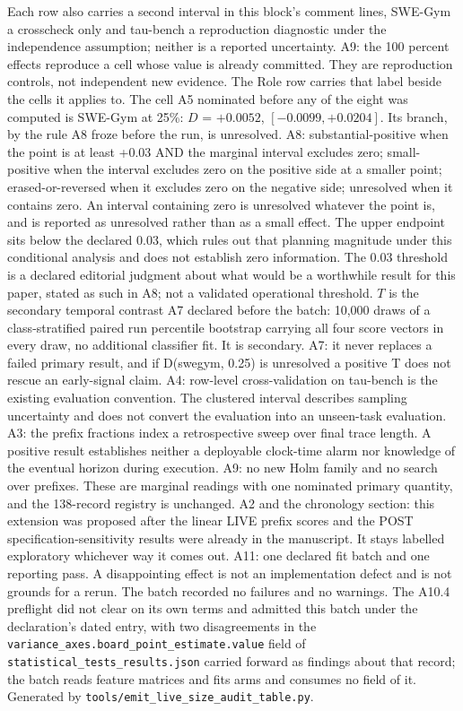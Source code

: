 Each row also carries a second interval in this block's comment lines, SWE-Gym a crosscheck only and tau-bench a reproduction diagnostic under the independence assumption; neither is a reported uncertainty.
A9: the 100 percent effects reproduce a cell whose value is already committed. They are reproduction controls, not independent new evidence.
The Role row carries that label beside the cells it applies to.
The cell A5 nominated before any of the eight was computed is SWE-Gym at 25\%: $D$ = $+0.0052$, $[-0.0099, +0.0204]$.
Its branch, by the rule A8 froze before the run, is unresolved.
A8: substantial-positive when the point is at least +0.03 AND the marginal interval excludes zero; small-positive when the interval excludes zero on the positive side at a smaller point; erased-or-reversed when it excludes zero on the negative side; unresolved when it contains zero.
An interval containing zero is unresolved whatever the point is, and is reported as unresolved rather than as a small effect.
The upper endpoint sits below the declared 0.03, which rules out that planning magnitude under this conditional analysis and does not establish zero information.
The 0.03 threshold is a declared editorial judgment about what would be a worthwhile result for this paper, stated as such in A8; not a validated operational threshold.
$T$ is the secondary temporal contrast A7 declared before the batch: 10,000 draws of a class-stratified paired run percentile bootstrap carrying all four score vectors in every draw, no additional classifier fit.
It is secondary. A7: it never replaces a failed primary result, and if D(swegym, 0.25) is unresolved a positive T does not rescue an early-signal claim.
A4: row-level cross-validation on tau-bench is the existing evaluation convention. The clustered interval describes sampling uncertainty and does not convert the evaluation into an unseen-task evaluation.
A3: the prefix fractions index a retrospective sweep over final trace length. A positive result establishes neither a deployable clock-time alarm nor knowledge of the eventual horizon during execution.
A9: no new Holm family and no search over prefixes. These are marginal readings with one nominated primary quantity, and the 138-record registry is unchanged.
A2 and the chronology section: this extension was proposed after the linear LIVE prefix scores and the POST specification-sensitivity results were already in the manuscript. It stays labelled exploratory whichever way it comes out.
A11: one declared fit batch and one reporting pass. A disappointing effect is not an implementation defect and is not grounds for a rerun.
The batch recorded no failures and no warnings.
The A10.4 preflight did not clear on its own terms and admitted this batch under the declaration's dated entry, with two disagreements in the \texttt{variance\_axes.board\_point\_estimate.value} field of \texttt{statistical\_tests\_results.json} carried forward as findings about that record; the batch reads feature matrices and fits arms and consumes no field of it.
Generated by \texttt{tools/emit\_live\_size\_audit\_table.py}.

